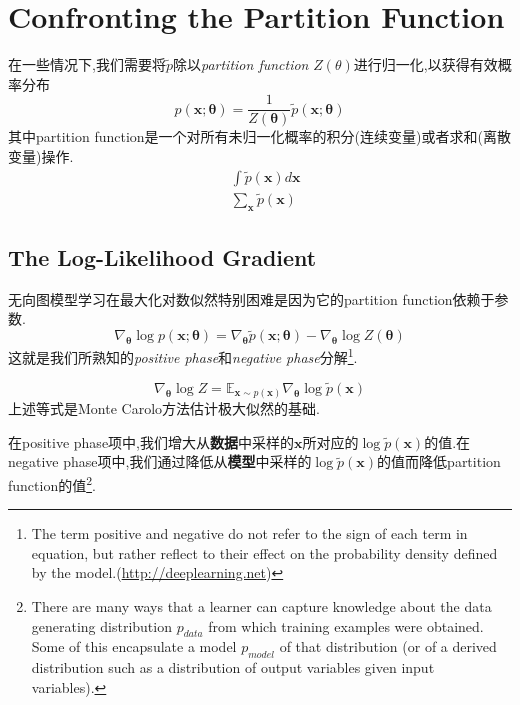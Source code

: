 \chapter{Confronting the Partition Function}\label{ch:partition_function}

在一些情况下,我们需要将$\tilde p$除以\textit{partition function} $Z(\theta)$进行归一化,以获得有效概率分布
\begin{equation}
p(\bm x;\bm\theta)=\frac{1}{Z(\bm\theta)}\tilde p(\bm x;\bm\theta)
\end{equation}
其中partition function是一个对所有未归一化概率的积分(连续变量)或者求和(离散变量)操作.
\begin{equation}\begin{split}
&\int\tilde p(\bm x)d\bm x\\
&\sum_{\bm x}\tilde p(\bm x)
\end{split}\end{equation}

\section{The Log-Likelihood Gradient}

无向图模型学习在最大化对数似然特别困难是因为它的partition function依赖于参数.
\begin{equation}
\nabla_{\bm\theta}\log p(\bm x;\bm\theta)=\nabla_{\bm\theta}\tilde p(\bm x;\bm\theta)-\nabla_{\bm\theta}\log Z(\bm\theta)
\end{equation}
这就是我们所熟知的\textit{positive phase}和\textit{negative phase}分解\footnote{The term positive and negative do not refer to the sign of each term in equation, but rather reflect to their effect on the probability density defined by the model.(\href{http://deeplearning.net/tutorial/rbm.html\#rbm}{http://deeplearning.net})}.

\begin{equation}\label{eq:gradient_of_log_partition_function}
\nabla_{\bm\theta}\log Z=\mathbb E_{\bm x\sim p(\bm x)}\nabla_{\bm\theta}\log\tilde p(\bm x)
\end{equation}
上述等式是Monte Carolo方法估计极大似然的基础.

在positive phase项中,我们增大从\textbf{数据}中采样的$\bm x$所对应的$\log\tilde p(\bm x)$的值.在negative phase项中,我们通过降低从\textbf{模型}中采样的$\log\tilde p(\bm x)$的值而降低partition function的值\footnote{There are many ways that a learner can capture knowledge about the data generating distribution $p_{data}$ from which training examples were obtained. Some of this encapsulate a model $p_{model}$ of that distribution (or of a derived distribution such as a distribution of output variables given input variables).}.

